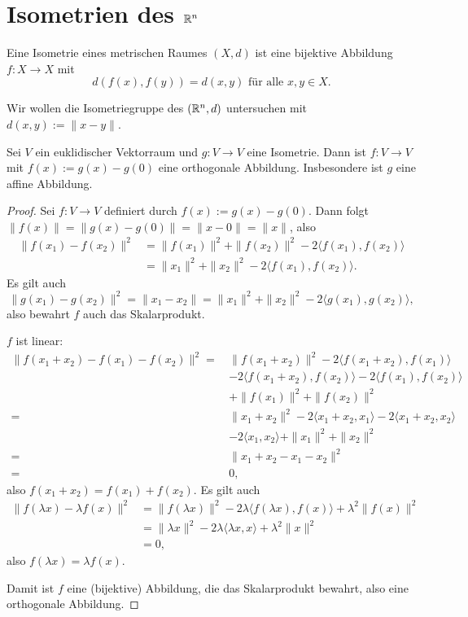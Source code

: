 \section{Isometrien des \texorpdfstring{$\mathbb{R}^n$}{Rn}}
Eine Isometrie eines metrischen Raumes $(X, d)$ ist eine bijektive Abbildung $f: X \to X$ mit
\[ d( f(x), f(y) ) = d(x,y) \text{ für alle } x, y \in X. \]

Wir wollen die Isometriegruppe des $(\mathbb{R}^n, d)$ untersuchen mit $d(x,y) := \| x - y \|$.

\begin{thm}
 Sei $V$ ein euklidischer Vektorraum und $g: V \to V$ eine Isometrie. Dann ist $f: V \to V$ mit $f(x) := g(x) - g(0)$ eine orthogonale Abbildung. Insbesondere ist $g$ eine affine Abbildung.
\end{thm}

\begin{proof}
 Sei $f: V \to V$ definiert durch $f(x) := g(x) - g(0)$. Dann folgt $\| f(x) \| = \| g(x) - g(0) \| = \| x - 0 \| = \| x \|$, also
 \begin{align*}
\| f(x_1) - f(x_2) \|^2 
    &= \| f(x_1) \|^2 + \| f(x_2) \|^2 - 2 \langle f(x_1), f(x_2) \rangle \\
    &= \| x_1 \|^2 + \| x_2 \|^2 - 2 \langle f(x_1), f(x_2) \rangle.
 \end{align*}
 Es gilt auch
 \[ \| g(x_1) - g(x_2) \|^2 = \| x_1 - x_2 \| = \| x_1 \|^2 + \| x_2 \|^2 - 2 \langle g(x_1), g(x_2) \rangle, \]
 also bewahrt $f$ auch das Skalarprodukt.
 
 $f$ ist linear:
 \begin{align*} \| f(x_1 + x_2) - f(x_1) - f(x_2) \|^2 
    =\, &\| f(x_1 + x_2) \|^2 
      - 2 \langle f(x_1 + x_2), f(x_1) \rangle \\
    & - 2 \langle f(x_1 + x_2), f(x_2) \rangle
      - 2 \langle f(x_1 ), f(x_2) \rangle \\
    & + \| f(x_1) \|^2 + \| f(x_2) \|^2 \\
    =\, &\| x_1 + x_2 \|^2 
      - 2 \langle x_1 + x_2, x_1 \rangle
      - 2 \langle x_1 + x_2, x_2 \rangle \\
    & - 2 \langle x_1, x_2 \rangle
      + \| x_1 \|^2 + \| x_2 \|^2 \\
    =\, &\| x_1 + x_2 - x_1 - x_2 \|^2 \\
    =\, &0,
 \end{align*}
 also $f(x_1 + x_2) = f(x_1) + f(x_2)$. Es gilt auch
 \begin{align*} \| f(\lambda x) - \lambda f(x) \|^2 &= \| f( \lambda x ) \|^2 
      - 2 \lambda \langle f( \lambda x ), f( x ) \rangle 
      + \lambda^2 \| f(x) \|^2 \\
    &= \| \lambda x \|^2
      - 2 \lambda \langle \lambda x, x \rangle
      + \lambda^2 \| x \|^2 \\
    &= 0,
 \end{align*}
 also $f(\lambda x) = \lambda f(x)$.
 
 Damit ist $f$ eine (bijektive) Abbildung, die das Skalarprodukt bewahrt, also eine orthogonale Abbildung.
\end{proof}


